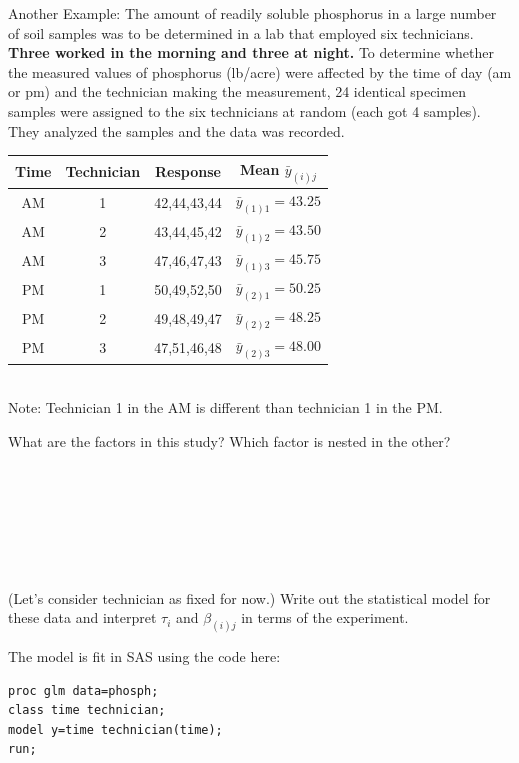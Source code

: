 \noindent Another Example: The amount of readily soluble phosphorus in a large number of soil samples was to be determined in a lab that employed six technicians.  \textbf{Three worked in the morning and three at night.}  To determine whether the measured values of phosphorus (lb/acre) were affected by the time of day (am or pm) and the technician making the measurement, 24 identical specimen samples were assigned to the six technicians at random (each got 4 samples).  They analyzed the samples and the data was recorded. \\
\begin{center}
\begin{tabular}{cc|c|c}
Time & Technician & Response & Mean $\bar{y}_{(i)j}$\\\hline
AM & 1 &42,44,43,44 & $\bar{y}_{(1)1}=43.25$\\
AM & 2&43,44,45,42& $\bar{y}_{(1)2}=43.50$\\
AM &3&47,46,47,43& $\bar{y}_{(1)3}=45.75$\\
PM &1&50,49,52,50& $\bar{y}_{(2)1}=50.25$\\
PM &2&49,48,49,47& $\bar{y}_{(2)2}=48.25$\\
PM &3&47,51,46,48& $\bar{y}_{(2)3}=48.00$\\
\end{tabular}	
~\\Note: Technician 1 in the AM is different than technician 1 in the PM.
\end{center}

What are the factors in this study?  Which factor is nested in the other?\\~\\~\\~\\~\\~\\~\\~\\
(Let's consider technician as fixed for now.)  Write out the statistical model for these data and interpret $\tau_i$ and $\beta_{(i)j}$ in terms of the experiment.

\newpage

The model is fit in SAS using the code here:\\
\begin{small}
\begin{verbatim}
proc glm data=phosph;
class time technician;
model y=time technician(time);
run;
\end{verbatim}
\end{small}

